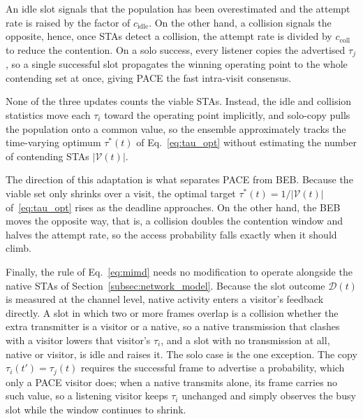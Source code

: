 \documentclass[a4paper,fleqn]{cas-dc}
\begin{document}
An idle slot signals that the
population has been overestimated and the attempt rate is raised by the factor of $c_\mathrm{idle}$. On the other hand, a collision signals the opposite, hence, once STAs detect a collision, the attempt rate is divided by $c_\mathrm{coll}$ to reduce the contention. On a solo success, every listener copies the advertised $\tau_j$, so a single successful slot propagates the winning operating point to the whole contending set at once, giving PACE the fast intra-visit consensus.

None of the three updates counts the viable STAs. Instead, the idle and collision statistics move each $\tau_i$ toward the operating point implicitly, and solo-copy pulls the population onto a common value, so the ensemble approximately tracks the time-varying optimum $\tau^*(t)$ of Eq.~\eqref{eq:tau_opt} without estimating the number of contending STAs $|\mathcal{V}(t)|$. 

The direction of this adaptation is what separates PACE from BEB. Because the viable set only shrinks over a visit, the optimal target $\tau^*(t)=1/|\mathcal{V}(t)|$ of~\eqref{eq:tau_opt} rises as the deadline approaches. On the other hand, the BEB moves the opposite way, that is, a collision doubles the contention window and halves the attempt rate, so the access probability falls exactly when it should climb.

Finally, the rule of Eq.~\eqref{eq:mimd} needs no modification to operate alongside the native STAs of Section~\ref{subsec:network_model}. Because the slot outcome $\mathcal{D}(t)$ is measured at the channel level, native activity enters a visitor's feedback directly. A slot in which two or more frames overlap is a collision whether the extra transmitter is a visitor or a native, so a native transmission that clashes with a visitor lowers that visitor's $\tau_i$, and a slot with no transmission at all, native or visitor, is idle and raises it. The solo case is the one exception. The copy $\tau_i(t') = \tau_j(t)$ requires the successful frame to advertise a probability, which only a PACE visitor does; when a native transmits alone, its frame carries no such value, so a listening visitor keeps $\tau_i$ unchanged and simply observes the busy slot while the window continues to shrink.

\end{document}
